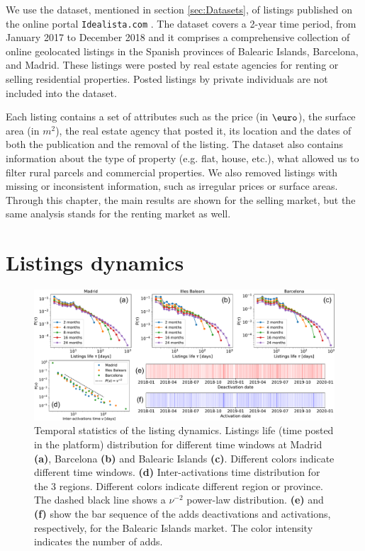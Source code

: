 We use the dataset, mentioned in section \ref{sec:Datasets}, of listings published on the online portal \texttt{Idealista.com} \cite{idealista}. The dataset covers a 2-year time period, from January 2017 to December 2018 and it comprises a comprehensive collection of online geolocated listings in the Spanish provinces of Balearic Islands, Barcelona, and Madrid. These listings were posted by real estate agencies for renting or selling residential properties. Posted listings by private individuals are not included into the dataset.

Each listing contains a set of attributes such as the price (in $\textup{\euro}$), the surface area (in $m^2$), the real estate agency that posted it, its location and the dates of both the publication and the removal of the listing. The dataset also contains information about the type of property (e.g. flat, house, etc.), what allowed us to filter rural parcels and commercial properties. We also removed listings with missing or inconsistent information, such as irregular prices or surface areas. Through this chapter, the main results are shown for the selling market, but the same analysis stands for the renting market as well.

\section{Listings dynamics}

\begin{figure}
    \centering
    \includegraphics[width =\textwidth]{Figs/Idealista_dynamics/panel_time.pdf}
	\caption[Temporal statistics of the listing dynamics.]{ \label{fig:panel_time} Temporal statistics of the listing dynamics. Listings life (time posted in the platform) distribution for different time windows at Madrid \textbf{(a)}, Barcelona \textbf{(b)} and Balearic Islands \textbf{(c)}. Different colors indicate different time windows. \textbf{(d)} Inter-activations time distribution for the 3 regions. Different colors indicate different region or province. The dashed black line shows a $\nu^{-2}$ power-law distribution. \textbf{(e)} and \textbf{(f)} show the bar sequence of the adds deactivations and activations, respectively, for the Balearic Islands market. The color intensity indicates the number of adds.}
\end{figure}


